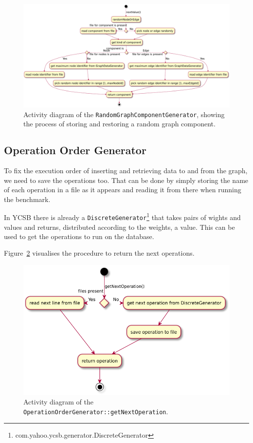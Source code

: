 \begin{figure}
  \includegraphics[width=\textwidth]{images/extensions/randomGraphComponentGenerator}
  \caption{Activity diagram of the \texttt{RandomGraphComponentGenerator}, showing the process of storing and restoring a random graph component.}
  \label{fig:randomGraphComponentGenerator}
\end{figure}

\subsection{Operation Order Generator}
\label{ch:design:se:operationOrderGenerator}
To fix the execution order of inserting and retrieving data to and from the graph,
we need to save the operations too.
That can be done by simply storing the name of each operation in a file as it appears and reading it from there when running the benchmark.

In YCSB there is already a \texttt{DiscreteGenerator}\footnote{com.yahoo.ycsb.generator.DiscreteGenerator} that takes pairs of wights and values and returns,
distributed according to the weights,
a value.
This can be used to get the operations to run on the database.

Figure~\ref{fig:operationOrderGenerator} visualises the procedure to return the next operations.

\begin{figure}
  \includegraphics[width=\textwidth]{images/extensions/OperationOrderGenerator}
  \caption{Activity diagram of the \texttt{OperationOrderGenerator::getNextOperation}.}
  \label{fig:operationOrderGenerator}
\end{figure}

